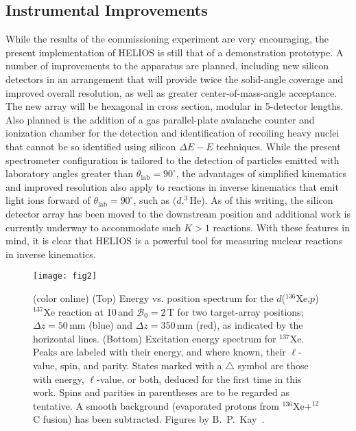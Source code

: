 \subsection{Instrumental Improvements}
\label{instr}
While the results of the commissioning experiment are very encouraging, the present implementation
of HELIOS is still that of a demonstration prototype.  A number of
improvements to the apparatus are planned, including new silicon
detectors in an arrangement that will provide twice the solid-angle
coverage and improved overall resolution, as well as greater
center-of-mass-angle acceptance.  The new array will be hexagonal in cross section, modular in 5-detector lengths.  Also planned is the addition of a
gas parallel-plate avalanche counter and ionization chamber for the
detection and identification of recoiling heavy nuclei that cannot be
so identified using silicon $\Delta E-E$ techniques.  While the
present spectrometer configuration is tailored to the detection of
particles emitted with laboratory angles greater than $\theta_\mathrm{lab}=90^\circ$, the
advantages of simplified kinematics and improved resolution also apply
to reactions in inverse kinematics that emit light ions
forward of $\theta_\mathrm{lab}=90^\circ$, such as $(d,^3$He).  As of this writing, the silicon detector array has been moved to the downstream position and additional work is currently underway
to accommodate such $K>1$ reactions.    With these features in mind, it is clear that HELIOS is a powerful tool for measuring nuclear reactions in inverse kinematics.

\begin{figure*}[h!]
\centering
\texttt{[image: fig2]}%
\caption[$E$ vs. $z$ and excitation energy spectrum for the $d$($^{136}$Xe,$p$)$^{137}$Xe reaction]{(color online) (Top) Energy vs. position spectrum for the $d$($^{136}$Xe,$p$)$^{137}$Xe reaction at 10\,\AMeV and $\mathscr{B}_0=2$\,T for two target-array positions; $\Delta z=50$\,mm (blue) and $\Delta z=350$\,mm (red), as indicated by the horizontal lines. 
(Bottom) Excitation energy spectrum for $^{137}$Xe.  Peaks are labeled with their energy, and where known, their $\ell$-value, spin, and parity. States marked with a $\triangle$ symbol are those with energy, $\ell$-value, or both, deduced for the first time in this work. Spins and parities in parentheses are to be regarded as tentative. A smooth background (evaporated protons from $^{136}\textrm{Xe} + ^{12}$C fusion) has been subtracted. Figures by B.~P.\ Kay~\cite{Kay_2011}.}
\label{fig2} 
\end{figure*}
